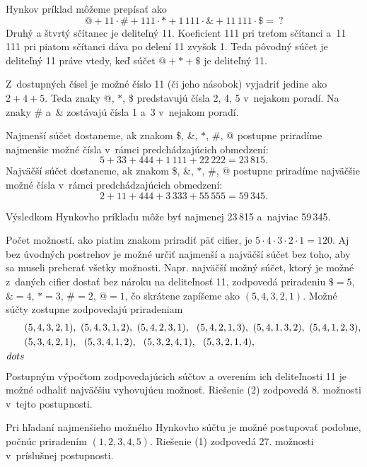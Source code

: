 {%
Hynkov príklad môžeme prepísať ako
$$
@ + 11\cdot\# +111\cdot*+ 1\,111\cdot\& +11\,111\cdot\$ =\ ?
$$
Druhý a štvrtý sčítanec je deliteľný 11.
Koeficient 111 pri treťom sčítanci a~11\,111 pri piatom sčítanci dáva po delení 11 zvyšok 1.
Teda pôvodný súčet je deliteľný 11 práve vtedy, keď súčet $@+*+\$$ je deliteľný 11.

Z~dostupných čísel je možné číslo 11 (či jeho násobok) vyjadriť jedine ako $2+4+5$.
Teda znaky @, $*$, \$ predstavujú čísla 2, 4, 5 v~nejakom poradí.
Na znaky \# a~\& zostávajú čísla 1 a~3 v~nejakom poradí.

Najmenší súčet dostaneme, ak znakom \$, \&, $*$, \#, @ postupne priradíme najmenšie možné čísla v~rámci predchádzajúcich obmedzení:
$$
5+33+444+1\,111+22\,222 =23\,815. \tag{1}
$$
Najväčší súčet dostaneme, ak znakom \$, \&, $*$, \#, @ postupne priradíme najväčšie možné čísla v~rámci predchádzajúcich obmedzení:
$$
2+11+444+3\,333+55\,555 =59\,345. \tag{2}
$$

Výsledkom Hynkovho príkladu môže byť najmenej 23\,815 a~najviac 59\,345.

\poznamka
Počet možností, ako piatim znakom priradiť päť cifier, je $5\cdot4\cdot3\cdot2\cdot1 =120$.
Aj bez úvodných postrehov je možné určiť najmenší a najväčší súčet bez toho, aby sa museli preberať všetky možnosti.
Napr. najväčší možný súčet, ktorý je možné z~daných cifier dostať bez nároku na deliteľnosť 11, zodpovedá priradeniu
$\$=5$, $\&=4$, $*=3$, $\#=2$, $@=1$, čo skrátene zapíšeme ako $(5,4,3,2,1)$.
Možné súčty zostupne zodpovedajú priradeniam
$$
\aligned
& (5,4,3,2,1),\ (5,4,3,1,2),\ (5,4,2,3,1),\ \ (5,4,2, 1,3),\ (5,4,1,3,2),\ (5,4,1,2,3),\\
& (5,3,4,2,1),\ \ (5,3,4,1,2),\ \ (5,3,2,4,1),\ \ (5,3,2, 1,4),\ \\dots\\
\endaligned
$$
Postupným výpočtom zodpovedajúcich súčtov a overením ich deliteľnosti 11 je možné odhaliť najväčšiu vyhovujúcu možnosť.
Riešenie (2) zodpovedá 8. možnosti v~tejto postupnosti.

Pri hľadaní najmenšieho možného Hynkovho súčtu je možné postupovať podobne, počnúc priradením $(1,2,3,4,5)$.
Riešenie (1) zodpovedá 27. možnosti v~príslušnej postupnosti.
}

